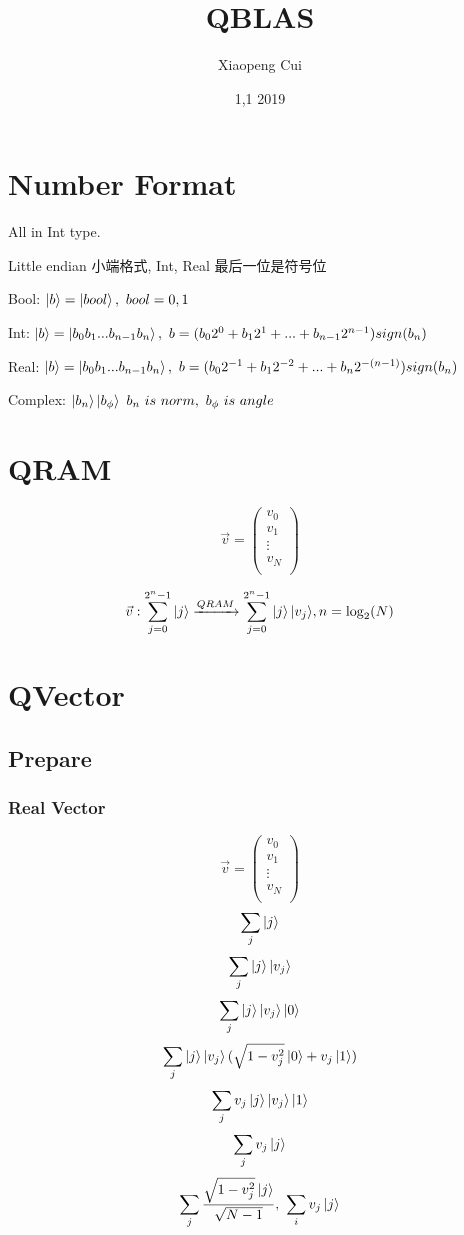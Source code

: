 \documentclass{article}
\begin{document}
\title{QBLAS}
\author{Xiaopeng Cui}
\date{1,1 2019}
\maketitle
\tableofcontents
\section{Number Format}
All in Int type.

Little endian 小端格式, Int, Real 最后一位是符号位

Bool: $ \ket{b} = \ket{bool},\ bool=0,1 $

Int: $ \ket{b} = \ket{b_0b_1...b_{n-1}b_n},	\  b= (b_0 2^0 + b_1 2^1+ ... + b_{n-1} 2^{n-1}) sign(b_n)  $

Real: $ \ket{b} = \ket{b_0b_1...b_{n-1}b_n},\ 	 b= (b_0 2^{-1} + b_1 2^{-2}+ ... + b_n 2^{-(n-1)} ) sign(b_n)  $

Complex: $ \ket{b_n}\ket{b_\phi} \ 	b_n\  is\  norm,\  b_\phi \  is\  angle $


\section{QRAM}
$$ \vec{v} =\left(
\begin{array}{c}
v_0 \\
v_1 \\
\vdots \\
v_N \\
\end{array}
\right) $$

$$ \vec{v}:		\sum_{ j=0 }^{ 2^n-1 } { \ket{j}}	\xrightarrow{QRAM}		\sum_{ j=0 }^{2^n-1} { \ket{j} \ket{v_j} },	n=\log_2(N)	$$	

\section{QVector}
\subsection{Prepare}
\subsubsection{ Real Vector}
$$ \vec{v} =\left(
\begin{array}{c}
v_0 \\
v_1 \\
\vdots \\
v_N \\
\end{array}
\right) $$
$$ \sum_j{ \ket{j} } $$
$$  \sum_j{\ket{j}\ket{v_j}} $$
$$  \sum_j{\ket{j}\ket{v_j} \ket{0} } $$
$$  \sum_j{\ket{j}\ket{v_j} ( \sqrt{1-v_j^2} \ket{0} + v_j\ket{1}) } $$
$$  \sum_j{v_j\ket{j}\ket{v_j}\ket{1} } $$
$$  \sum_j{v_j\ket{j} } $$
$$ \sum_j {\frac{\sqrt{1-v_j^2} \ket{j} } {\sqrt{N-1} } } ,\   \sum_i{ v_j\ket{j}  } $$
\end{document}
